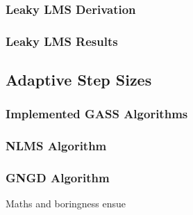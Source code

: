\documentclass[./main.tex]{subfiles}
\begin{document}
\subsubsection{Leaky LMS Derivation}

\subsubsection{Leaky LMS Results}


\subsection{Adaptive Step Sizes}

\subsubsection{Implemented GASS Algorithms}

\subsubsection{NLMS Algorithm}

\subsubsection{GNGD Algorithm}

Maths and boringness ensue




%  	


 		
\end{document}
